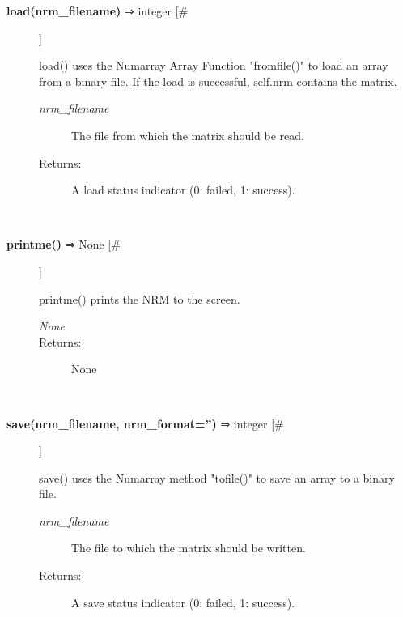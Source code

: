 \begin{description}
\item[\textbf{load(nrm\_filename)} ⇒ integer [\#]
]
\par load() uses the Numarray Array Function "fromfile()" to load an array from a
binary file.  If the load is successful, self.nrm contains the matrix.
\begin{description}
\item[\textit{nrm\_filename}
]
The file from which the matrix should be read.
\item[Returns:
]
A load status indicator (0: failed, 1: success).
\end{description}\\

\item[\textbf{printme()} ⇒ None [\#]
]
\par printme() prints the NRM to the screen.
\begin{description}
\item[\textit{None}
]

\item[Returns:
]
None
\end{description}\\

\item[\textbf{save(nrm\_filename, nrm\_format='')} ⇒ integer [\#]
]
\par save() uses the Numarray method "tofile()" to save an array to a binary file.
\begin{description}
\item[\textit{nrm\_filename}
]
The file to which the matrix should be written.
\item[Returns:
]
A save status indicator (0: failed, 1: success).
\end{description}\\

\end{description}
